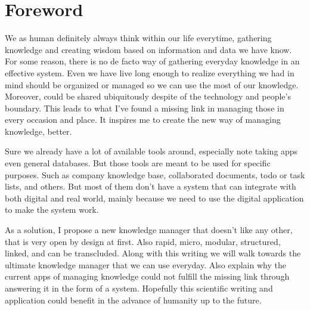 \begingroup
\let\clearpage\relax
\let\cleardoublepage\relax

\chapter{Foreword}
\label{chap:foreword}

We as human definitely always think within our life everytime, gathering knowledge and creating wisdom based on information and data we have know. For some reason, there is no de facto way of gathering everyday knowledge in an effective system. Even we have live long enough to realize everything we had in mind should be organized or managed so we can use the most of our knowledge. Moreover, could be shared ubiquitously despite of the technology and people's boundary. This leads to what I've found a missing link in managing those in every occasion and place. It inspires me to create the new way of managing knowledge, better.

Sure we already have a lot of available tools around, especially note taking apps even general databases. But those tools are meant to be used for specific purposes. Such as company knowledge base, collaborated documents, todo or task lists, and others. But most of them don't have a system that can integrate with both digital and real world, mainly because we need to use the digital application to make the system work.

As a solution, I propose a new knowledge manager that doesn't like any other, that is very open by design at first. Also rapid, micro, modular, structured, linked, and can be transcluded. Along with this writing we will walk towards the ultimate knowledge manager that we can use everyday. Also explain why the current apps of managing knowledge could not fulfill the missing link through answering it in the form of a system. Hopefully this scientific writing and application could benefit in the advance of humanity up to the future.

\endgroup

